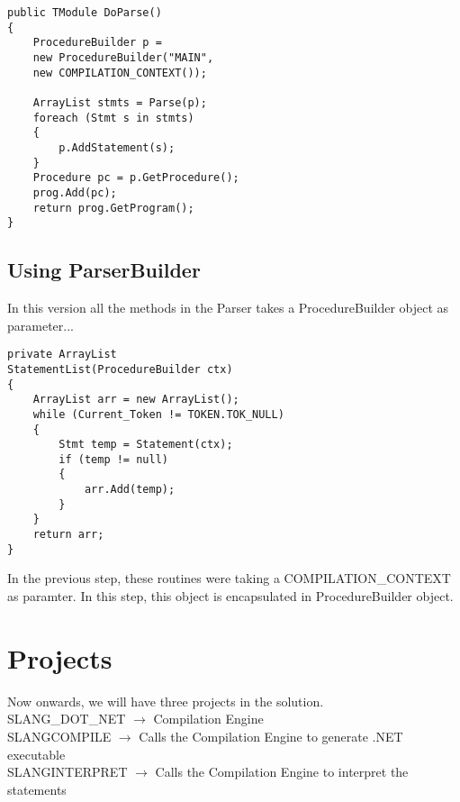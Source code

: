 \lstset{style=csharp}
\begin{lstlisting}
public TModule DoParse()
{
	ProcedureBuilder p = 
	new ProcedureBuilder("MAIN", 
	new COMPILATION_CONTEXT());
	
	ArrayList stmts = Parse(p);
	foreach (Stmt s in stmts)
	{
		p.AddStatement(s);
	}
	Procedure pc = p.GetProcedure();
	prog.Add(pc);
	return prog.GetProgram();
}
\end{lstlisting}
\subsection{Using ParserBuilder}
In this version all the methods in the Parser takes a ProcedureBuilder object as parameter...
\lstset{style=csharp}
\begin{lstlisting}
private ArrayList 
StatementList(ProcedureBuilder ctx)
{
	ArrayList arr = new ArrayList();
	while (Current_Token != TOKEN.TOK_NULL)
	{
		Stmt temp = Statement(ctx);
		if (temp != null)
		{
			arr.Add(temp);
		}
	}
	return arr;
}
\end{lstlisting}
In the previous step, these routines were taking a COMPILATION\_CONTEXT as paramter. In this step, this object is encapsulated in ProcedureBuilder object.

\section{Projects}
Now onwards, we will have three projects in the solution.\\
SLANG\_DOT\_NET $\rightarrow$ Compilation Engine\\
SLANGCOMPILE $\rightarrow$ Calls the Compilation Engine to generate .NET executable\\
SLANGINTERPRET $\rightarrow$ Calls the Compilation Engine to interpret the statements\\
